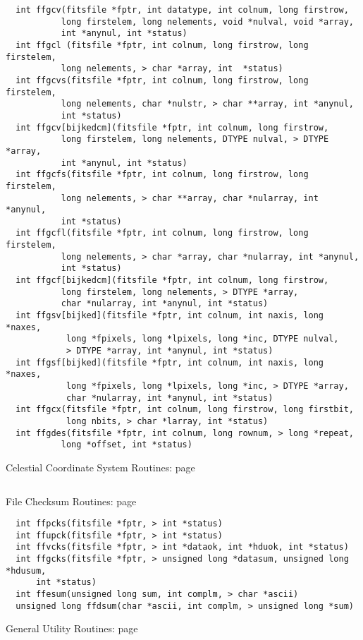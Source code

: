 \begin{verbatim}
  int ffgcv(fitsfile *fptr, int datatype, int colnum, long firstrow,
           long firstelem, long nelements, void *nulval, void *array,
           int *anynul, int *status)
  int ffgcl (fitsfile *fptr, int colnum, long firstrow, long firstelem,
           long nelements, > char *array, int  *status)
  int ffgcvs(fitsfile *fptr, int colnum, long firstrow, long firstelem,
           long nelements, char *nulstr, > char **array, int *anynul,
           int *status)
  int ffgcv[bijkedcm](fitsfile *fptr, int colnum, long firstrow,
           long firstelem, long nelements, DTYPE nulval, > DTYPE *array,
           int *anynul, int *status)
  int ffgcfs(fitsfile *fptr, int colnum, long firstrow, long firstelem,
           long nelements, > char **array, char *nularray, int *anynul,
           int *status)
  int ffgcfl(fitsfile *fptr, int colnum, long firstrow, long firstelem,
           long nelements, > char *array, char *nularray, int *anynul,
           int *status)
  int ffgcf[bijkedcm](fitsfile *fptr, int colnum, long firstrow,
           long firstelem, long nelements, > DTYPE *array,
           char *nularray, int *anynul, int *status)
  int ffgsv[bijked](fitsfile *fptr, int colnum, int naxis, long *naxes,
            long *fpixels, long *lpixels, long *inc, DTYPE nulval,
            > DTYPE *array, int *anynul, int *status)
  int ffgsf[bijked](fitsfile *fptr, int colnum, int naxis, long *naxes,
            long *fpixels, long *lpixels, long *inc, > DTYPE *array,
            char *nularray, int *anynul, int *status)
  int ffgcx(fitsfile *fptr, int colnum, long firstrow, long firstbit,
            long nbits, > char *larray, int *status)
  int ffgdes(fitsfile *fptr, int colnum, long rownum, > long *repeat,
           long *offset, int *status)
\end{verbatim}
 Celestial Coordinate System Routines: page~\pageref{FFGICS}

\begin{verbatim}

\end{verbatim}
 File Checksum Routines: page~\pageref{FFPCKS}

\begin{verbatim}
  int ffpcks(fitsfile *fptr, > int *status)
  int ffupck(fitsfile *fptr, > int *status)
  int ffvcks(fitsfile *fptr, > int *dataok, int *hduok, int *status)
  int ffgcks(fitsfile *fptr, > unsigned long *datasum, unsigned long *hdusum,
      int *status)
  int ffesum(unsigned long sum, int complm, > char *ascii)
  unsigned long ffdsum(char *ascii, int complm, > unsigned long *sum)
\end{verbatim}
 General Utility Routines: page~\pageref{FFVERS}

